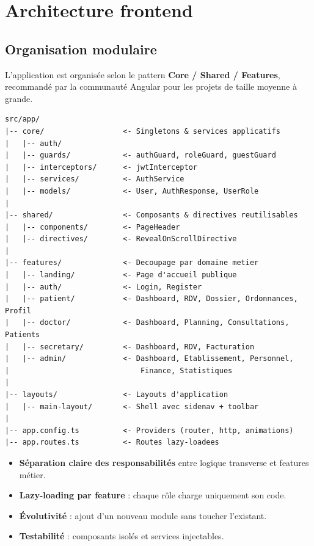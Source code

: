 \documentclass[11pt,a4paper]{article}
\begin{document}
\newpage

\section{Architecture frontend}

\subsection{Organisation modulaire}

L'application est organisée selon le pattern \textbf{Core / Shared / Features},
recommandé par la communauté Angular pour les projets de taille moyenne à
grande.

\begin{lstlisting}[language={}, basicstyle=\ttfamily\footnotesize]
src/app/
|-- core/                  <- Singletons & services applicatifs
|   |-- auth/
|   |-- guards/            <- authGuard, roleGuard, guestGuard
|   |-- interceptors/      <- jwtInterceptor
|   |-- services/          <- AuthService
|   |-- models/            <- User, AuthResponse, UserRole
|
|-- shared/                <- Composants & directives reutilisables
|   |-- components/        <- PageHeader
|   |-- directives/        <- RevealOnScrollDirective
|
|-- features/              <- Decoupage par domaine metier
|   |-- landing/           <- Page d'accueil publique
|   |-- auth/              <- Login, Register
|   |-- patient/           <- Dashboard, RDV, Dossier, Ordonnances, Profil
|   |-- doctor/            <- Dashboard, Planning, Consultations, Patients
|   |-- secretary/         <- Dashboard, RDV, Facturation
|   |-- admin/             <- Dashboard, Etablissement, Personnel,
|                              Finance, Statistiques
|
|-- layouts/               <- Layouts d'application
|   |-- main-layout/       <- Shell avec sidenav + toolbar
|
|-- app.config.ts          <- Providers (router, http, animations)
|-- app.routes.ts          <- Routes lazy-loadees
\end{lstlisting}

\begin{successbox}[title={Bénéfices de cette structure}]
\begin{itemize}
  \item \textbf{Séparation claire des responsabilités} entre logique transverse et features métier.
  \item \textbf{Lazy-loading par feature} : chaque rôle charge uniquement son code.
  \item \textbf{Évolutivité} : ajout d'un nouveau module sans toucher l'existant.
  \item \textbf{Testabilité} : composants isolés et services injectables.
\end{itemize}
\end{successbox}
\end{document}
